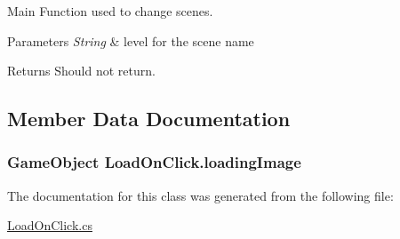 Main Function used to change scenes. 


\begin{DoxyParams}{Parameters}
{\em String} & level for the scene name \\
\hline
\end{DoxyParams}
\begin{DoxyReturn}{Returns}
Should not return. 
\end{DoxyReturn}


\subsection{Member Data Documentation}
\hypertarget{class_load_on_click_a9135e1be868b982e1c8ff7242d35e469}{}
\subsubsection[{loading\+Image}]{\setlength{\rightskip}{0pt plus 5cm}Game\+Object Load\+On\+Click.\+loading\+Image}\label{class_load_on_click_a9135e1be868b982e1c8ff7242d35e469}


The documentation for this class was generated from the following file\+:\begin{DoxyCompactItemize}
\item 
\hyperlink{_load_on_click_8cs}{Load\+On\+Click.\+cs}\end{DoxyCompactItemize}
